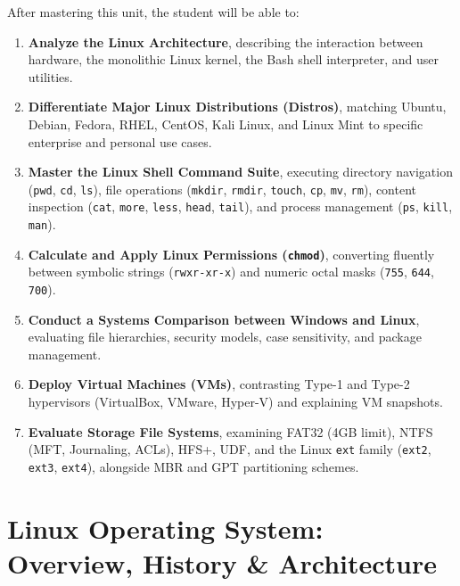 \begin{important}
After mastering this unit, the student will be able to:
\begin{enumerate}[leftmargin=1.5em]
    \item \textbf{Analyze the Linux Architecture}, describing the interaction between hardware, the monolithic Linux kernel, the Bash shell interpreter, and user utilities.
    \item \textbf{Differentiate Major Linux Distributions (Distros)}, matching Ubuntu, Debian, Fedora, RHEL, CentOS, Kali Linux, and Linux Mint to specific enterprise and personal use cases.
    \item \textbf{Master the Linux Shell Command Suite}, executing directory navigation (\texttt{pwd}, \texttt{cd}, \texttt{ls}), file operations (\texttt{mkdir}, \texttt{rmdir}, \texttt{touch}, \texttt{cp}, \texttt{mv}, \texttt{rm}), content inspection (\texttt{cat}, \texttt{more}, \texttt{less}, \texttt{head}, \texttt{tail}), and process management (\texttt{ps}, \texttt{kill}, \texttt{man}).
    \item \textbf{Calculate and Apply Linux Permissions (\texttt{chmod})}, converting fluently between symbolic strings (\texttt{rwxr-xr-x}) and numeric octal masks (\texttt{755}, \texttt{644}, \texttt{700}).
    \item \textbf{Conduct a Systems Comparison between Windows and Linux}, evaluating file hierarchies, security models, case sensitivity, and package management.
    \item \textbf{Deploy Virtual Machines (VMs)}, contrasting Type-1 and Type-2 hypervisors (VirtualBox, VMware, Hyper-V) and explaining VM snapshots.
    \item \textbf{Evaluate Storage File Systems}, examining FAT32 (4GB limit), NTFS (MFT, Journaling, ACLs), HFS+, UDF, and the Linux \texttt{ext} family (\texttt{ext2}, \texttt{ext3}, \texttt{ext4}), alongside MBR and GPT partitioning schemes.
\end{enumerate}
\end{important}

\section{Linux Operating System: Overview, History \& Architecture}

